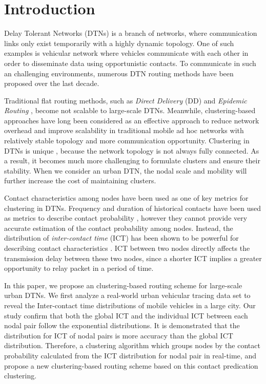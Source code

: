 \documentclass[conference]{IEEEtran}
\begin{document}
\section{Introduction}
\label{INTRODUCTION}
Delay Tolerant Networks (DTNs) \cite{aFall-2,cAhmedSalil-4} is a branch of networks,
where communication links only exist temporarily with a highly dynamic topology. One of such examples is vehicular network where vehicles communicate with each other in order to disseminate data using opportunistic contacts. To communicate in such an challenging environments, numerous DTN routing methods have been proposed over the last decade.

Traditional flat routing methods, such as \emph{Direct Delivery} (DD) \cite{eKleywegtNori-6} and \emph{Epidemic Routing} \cite{gVahdatBecker-8}, become not scalable to large-scale DTNs. Meanwhile, clustering-based approaches have long been considered as an effective approach to reduce network overhead and improve scalability in traditional mobile ad hoc networks \cite{hAgarwalMotwani-9,iLiuLiu-10,jWangMi-11,kWhitbeckConan-12} with relatively stable topology and more communication opportunity.
Clustering in DTNs is unique \cite{uHaHongyi-22,kernal2005survey}, because the network topology is not always fully connected. As a result, it becomes much more challenging to formulate clusters and ensure their stability. When we consider an urban DTN, the nodal scale and mobility will further increase the cost of maintaining clusters.

Contact characteristics among nodes \cite{nGaoCao-15,oWhitbeckConan-16,p20102413007279} have been used as one of key metrics for clustering in DTNs. Frequency and duration of historical contacts have been used as metrics to describe contact probability \cite{rLiHui-19,t20102413006168}, however they cannot provide very accurate estimation of the contact probability among nodes. Instead, the distribution of  \emph{inter-contact time} (ICT) has been shown to be powerful for describing contact characteristics \cite{rLiHui-19,qGroeneveltNain-18,s20104613388174}. ICT between two nodes directly affects the transmission delay between these two nodes, since a shorter ICT implies a greater opportunity to relay packet in a period of time.

In this paper, we propose an clustering-based routing scheme for large-scale urban DTNs.  We first
analyze a real-world urban vehicular tracing data set to reveal the Inter-contact time distributions of mobile vehicles in a large city. Our study confirm that both the global ICT and the individual ICT between each nodal pair follow the exponential distributions.
It is demonstrated that the distribution for ICT of nodal pairs is more accuracy than the global ICT distribution. Therefore, a clustering algorithm which groups nodes by the contact probability calculated from the ICT distribution for nodal pair in real-time, and propose a new clustering-based routing scheme based on this contact predication clustering.
\end{document}
